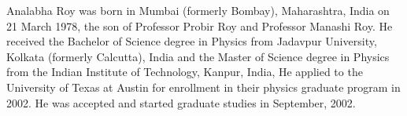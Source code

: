 \documentclass[12pt]{report}	%
\theoremstyle{definition}
\theoremstyle{remark}
\begin{document}
\printindex%



\begin{vita}
Analabha Roy
was born in Mumbai (formerly Bombay), Maharashtra, India on 21 March 1978, the son of
Professor Probir Roy and Professor Manashi Roy.  He received the Bachelor
of Science degree in Physics from Jadavpur University, Kolkata (formerly Calcutta), India and 
the Master of Science degree in Physics from the Indian Institute of Technology, Kanpur, India,
He applied to the University of Texas at Austin for enrollment
in their physics graduate program in 2002. He was accepted and started graduate studies in
September, 2002.

\end{vita}
\end{document}
